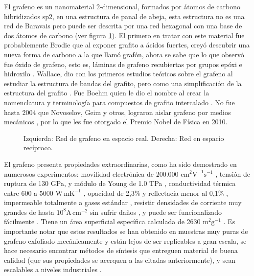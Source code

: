 El grafeno es un nanomaterial 2-dimensional, formados por átomos de carbono  hibridizados sp2, en una estructura de panal de abeja, esta estructura no es una red de Baravais pero puede ser descrita por una red hexagonal con una base de dos átomos de carbono (ver figura \ref{fig_graphene_lattice}). El primero en tratar con este material fue probablemente Brodie \citep{Brodie1859} que al exponer grafito a ácidos fuertes, creyó descubrir una nueva forma de carbono a la que llamó grafón, ahora se sabe que lo que observó fue óxido de grafeno, esto es, láminas de grafeno recubiertas por grupos epóxi e hidroxilo \citep{Geim2012}. Wallace, dio con los primeros estudios teóricos sobre el grafeno al estudiar la estructura de bandas del grafito, pero como una simplificación de la estructura del grafito \citep{Wallace1947}. Fue Boehm quien le dio el nombre al crear la nomenclatura y terminología para compuestos de grafito intercalado \citep{Boehm1986}. No fue hasta 2004 que Novoselov, Geim y otros, lograron aislar grafeno por medios mecánicos \citep{Novoselov2004}, por lo que les fue otorgado el Premio Nobel de Física en 2010.


\begin{figure}
	\centering
	\caption{Izquierda: Red de grafeno en espacio real. Derecha: Red en espacio recíproco.}
	\label{fig_graphene_lattice}
\end{figure}
El grafeno presenta propiedades extraordinarias, como ha sido demostrado en numerosos experimentos: movilidad electrónica de 200.000 $\mathrm{cm^2 V^{-1} s^{-1} }$ \citep{Bolotin2008}, tensión de ruptura de 130 GPa, y módulo de Young de 1.0 TPa \citep{Lee2008}, conductividad térmica entre 600 a 5000 $\mathrm{W\, mK^{-1}}$ \citep{Balandin2011}, opacidad de 2,3\% y reflectacia menor al 0,1\% \citep{Nair2008}, impermeable totalmente a gases estándar \citep{Bunch2007}, resistir densidades de corriente muy grandes de hasta $\mathrm{10^8 A\, cm^{-2}}$ sin sufrir daños  \citep{Moser2007}, y puede ser funcionalizado fácilmente \citep{Loh2010}. Tiene un área superficial específica calculada de 2630 $\mathrm{m^2 g^{-1}}$ \citep{Peigney2001}. Es importante notar que estos resultados se han obtenido en muestras muy puras de grafeno exfoliado mecánicamente \citep{Novoselov2004} y están lejos de ser replicables a gran escala, se hace necesario encontrar métodos de síntesis que entreguen material de buena calidad (que sus propiedades se acerquen a las citadas anteriormente), y sean escalables a niveles industriales \citep{Novoselov2012}.

